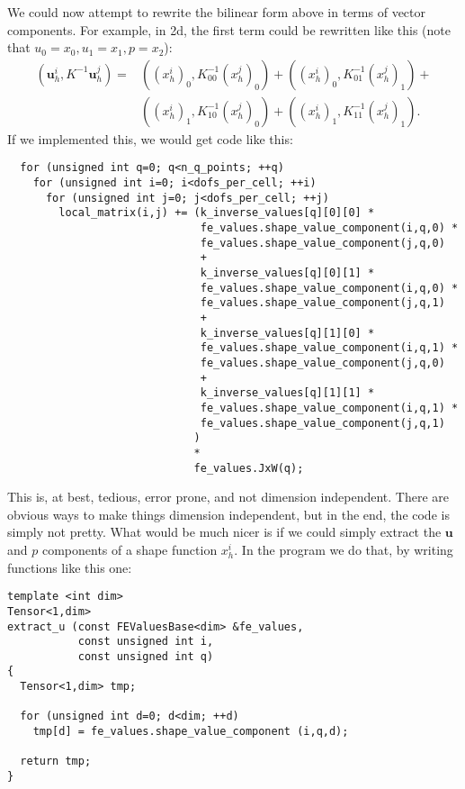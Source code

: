 \documentclass{article}
\renewcommand{\vec}[1]{\mathbf{#1}}
\begin{document}
We could now attempt to rewrite the bilinear form above in terms of vector
components. For example, in 2d, the first term could be rewritten like this
(note that $u_0=x_0, u_1=x_1, p=x_2$):
\begin{align*}
  (\vec u_h^i, K^{-1}\vec u_h^j)
  =
  &\left((x_h^i)_0, K^{-1}_{00} (x_h^j)_0\right) +
   \left((x_h^i)_0, K^{-1}_{01} (x_h^j)_1\right) + \\
  &\left((x_h^i)_1, K^{-1}_{10} (x_h^j)_0\right) +
   \left((x_h^i)_1, K^{-1}_{11} (x_h^j)_1\right).
\end{align*}
If we implemented this, we would get code like this:
\begin{verbatim}
  for (unsigned int q=0; q<n_q_points; ++q) 
    for (unsigned int i=0; i<dofs_per_cell; ++i)
      for (unsigned int j=0; j<dofs_per_cell; ++j)
        local_matrix(i,j) += (k_inverse_values[q][0][0] *
                              fe_values.shape_value_component(i,q,0) *
                              fe_values.shape_value_component(j,q,0) 
                              +
                              k_inverse_values[q][0][1] *
                              fe_values.shape_value_component(i,q,0) *
                              fe_values.shape_value_component(j,q,1) 
                              +
                              k_inverse_values[q][1][0] *
                              fe_values.shape_value_component(i,q,1) *
                              fe_values.shape_value_component(j,q,0) 
                              +
                              k_inverse_values[q][1][1] *
                              fe_values.shape_value_component(i,q,1) *
                              fe_values.shape_value_component(j,q,1) 
                             )
                             *
                             fe_values.JxW(q);
\end{verbatim}
This is, at best, tedious, error prone, and not dimension independent. There
are obvious ways to make things dimension independent, but in the end, the
code is simply not pretty. What would be much nicer is if we could simply
extract the $\vec u$ and $p$ components of a shape function $x_h^i$. In the
program we do that, by writing functions like this one:
\begin{verbatim}
template <int dim>
Tensor<1,dim>
extract_u (const FEValuesBase<dim> &fe_values,
           const unsigned int i,
           const unsigned int q)
{
  Tensor<1,dim> tmp;

  for (unsigned int d=0; d<dim; ++d)
    tmp[d] = fe_values.shape_value_component (i,q,d);

  return tmp;
}
\end{verbatim}
\end{document}
